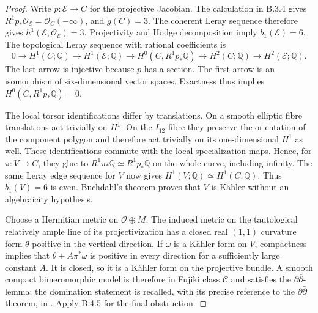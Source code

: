 \begin{proof}
Write $p:\mathscr E\to C$ for the projective Jacobian.
The calculation in B.3.4 gives
$R^1p_*\mathcal O_{\mathscr E}=\mathcal O_C(-\infty)$,
and $g(C)=3$. The coherent Leray sequence therefore gives
$h^1(\mathscr E,\mathcal O_{\mathscr E})=3$. Projectivity
and Hodge decomposition imply $b_1(\mathscr E)=6$.
The topological Leray sequence with rational coefficients is
\[
 0\longrightarrow H^1(C;\mathbb Q)
 \longrightarrow H^1(\mathscr E;\mathbb Q)
 \longrightarrow H^0(C,R^1p_*\mathbb Q)
 \longrightarrow H^2(C;\mathbb Q)
 \longrightarrow H^2(\mathscr E;\mathbb Q).
\]
The last arrow is injective because $p$ has a section.
The first arrow is an isomorphism of six-dimensional
vector spaces. Exactness thus implies
$H^0(C,R^1p_*\mathbb Q)=0$.

The local torsor identifications differ by translations.
On a smooth elliptic fibre translations act trivially on
$H^1$. On the $I_{12}$ fibre they preserve the orientation
of the component polygon and therefore act trivially on
its one-dimensional $H^1$ as well. These identifications
commute with the local specialization maps. Hence, for
$\pi:V\to C$, they glue to
$R^1\pi_*\mathbb Q\simeq R^1p_*\mathbb Q$ on the whole
curve, including infinity. The same Leray edge sequence
for $V$ now gives
$H^1(V;\mathbb Q)\simeq H^1(C;\mathbb Q)$.
Thus $b_1(V)=6$ is even. Buchdahl's theorem
\cite[Theorem 11, p.297]{Buchdahl1999} proves that $V$
is K\"ahler without an algebraicity hypothesis.

Choose a Hermitian metric on $\mathcal O\oplus M$.
The induced metric on the tautological relatively ample
line of its projectivization has a closed real $(1,1)$
curvature form $\theta$ positive in the vertical direction.
If $\omega$ is a K\"ahler form on $V$, compactness implies
that $\theta+A\pi^*\omega$ is positive in every direction
for a sufficiently large constant $A$. It is closed, so
it is a K\"ahler form on the projective bundle. A smooth
compact bimeromorphic model is therefore in Fujiki class
$\mathcal C$ and satisfies the $\partial\bar\partial$-lemma;
the domination statement is recalled, with its precise
reference to the $\partial\bar\partial$ theorem, in
\cite[Section 2.1, p.8]{Chen2026HodgeRoot}. Apply B.4.5
for the final obstruction.
\end{proof}
